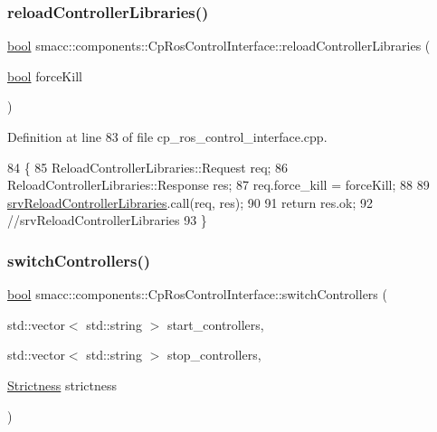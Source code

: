 \subsubsection{\texorpdfstring{reload\+Controller\+Libraries()}{reloadControllerLibraries()}}
{\footnotesize\ttfamily \hyperlink{classbool}{bool} smacc\+::components\+::\+Cp\+Ros\+Control\+Interface\+::reload\+Controller\+Libraries (\begin{DoxyParamCaption}\item[{\hyperlink{classbool}{bool}}]{force\+Kill }\end{DoxyParamCaption})}



Definition at line 83 of file cp\+\_\+ros\+\_\+control\+\_\+interface.\+cpp.


\begin{DoxyCode}
84 \{
85     ReloadControllerLibraries::Request req;
86     ReloadControllerLibraries::Response res;
87     req.force\_kill = forceKill;
88 
89     \hyperlink{classsmacc_1_1components_1_1CpRosControlInterface_afdfece75d6aa438fae728e72add50e16}{srvReloadControllerLibraries}.call(req, res);
90 
91     \textcolor{keywordflow}{return} res.ok;
92     \textcolor{comment}{//srvReloadControllerLibraries}
93 \}
\end{DoxyCode}
\mbox{\label{classsmacc_1_1components_1_1CpRosControlInterface_a1cdb86924bbc0ab5f932d5504a943cbb}} 
\subsubsection{\texorpdfstring{switch\+Controllers()}{switchControllers()}}
{\footnotesize\ttfamily \hyperlink{classbool}{bool} smacc\+::components\+::\+Cp\+Ros\+Control\+Interface\+::switch\+Controllers (\begin{DoxyParamCaption}\item[{std\+::vector$<$ std\+::string $>$}]{start\+\_\+controllers,  }\item[{std\+::vector$<$ std\+::string $>$}]{stop\+\_\+controllers,  }\item[{\hyperlink{namespacesmacc_1_1components_a18117d6a71feb2471fb4e07f47674e4c}{Strictness}}]{strictness }\end{DoxyParamCaption})}



